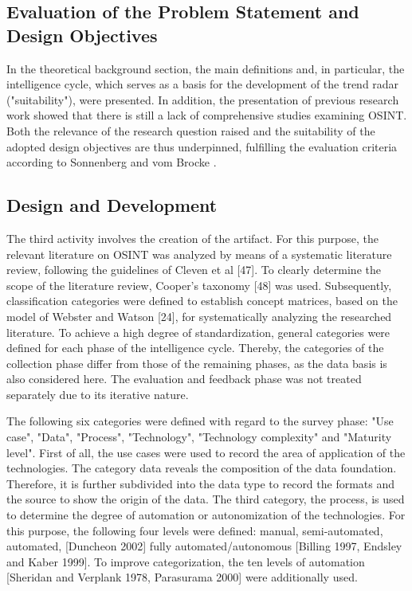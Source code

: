 \documentclass[10pt]{article}
\begin{document}
\subsection{Evaluation of the Problem Statement and Design Objectives}

In the theoretical background section, the main definitions and, in
particular, the intelligence cycle, which serves as a basis for the
development of the trend radar ("suitability"), were presented. In
addition, the presentation of previous research work showed that there
is still a lack of comprehensive studies examining OSINT. Both the
relevance of the research question raised and the suitability of the
adopted design objectives are thus underpinned, fulfilling the
evaluation criteria according to Sonnenberg and vom Brocke \cite{Sonnenberg}.

\subsection{Design and Development}

The third activity involves the creation of the artifact. For this
purpose, the relevant literature on OSINT was analyzed by means of a
systematic literature review, following the guidelines of
Cleven et al [47]. To clearly determine the scope of the literature
review, Cooper's taxonomy [48] was used. Subsequently, classification
categories were defined to establish concept matrices, based on the
model of Webster and Watson [24], for systematically analyzing the
researched literature. To achieve a high degree of standardization,
general categories were defined for each phase of the intelligence
cycle. Thereby, the categories of the collection phase differ from
those of the remaining phases, as the data basis is also considered
here. The evaluation and feedback phase was not treated separately due
to its iterative nature.

The following six categories were defined with regard to the survey
phase: "Use case", "Data", "Process", "Technology", "Technology
complexity" and "Maturity level". First of all, the use cases were
used to record the area of application of the technologies. The
category data reveals the composition of the data foundation. Therefore,
it is further subdivided into the data type to record the formats and
the source to show the origin of the data. The third category, the
process, is used to determine the degree of automation or
autonomization of the technologies. For this purpose, the following
four levels were defined: manual, semi-automated, automated,
[Duncheon 2002] fully automated/autonomous
[Billing 1997, Endsley and Kaber 1999]. To improve categorization,
the ten levels of automation 
[Sheridan and Verplank 1978, Parasurama 2000] were additionally used.
\end{document}
